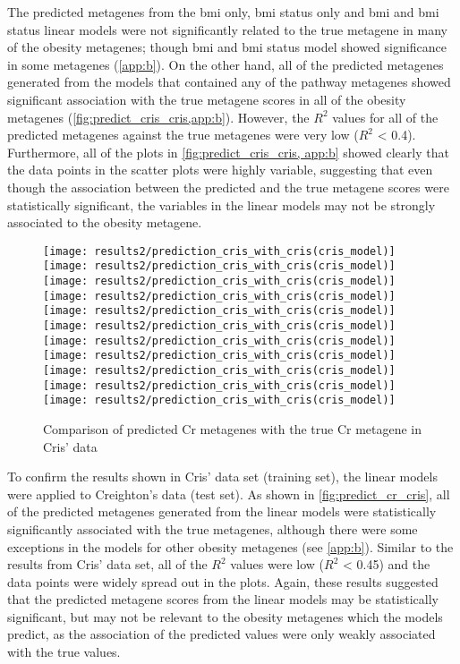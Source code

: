 The predicted metagenes from the \gls{bmi} only, \gls{bmi} status only and \gls{bmi} and \gls{bmi} status linear models were not significantly related to the true metagene in many of the obesity metagenes; though \gls{bmi} and \gls{bmi} status model showed significance in some metagenes (\cref{app:b}).
On the other hand, all of the predicted metagenes generated from the models that contained any of the pathway metagenes showed significant association with the true metagene scores in all of the obesity metagenes (\cref{fig:predict_cris_cris,app:b}).
However, the $R^2$ values for all of the predicted metagenes against the true metagenes were very low ($R^2$ \textless{} 0.4).
Furthermore, all of the plots in \cref{fig:predict_cris_cris, app:b} showed clearly that the data points in the scatter plots were highly variable, suggesting that even though the association between the predicted and the true metagene scores were statistically significant, the variables in the linear models may not be strongly associated to the obesity metagene.

\begin{figure}[htpb]
	\centering
	\texttt{[image: results2/prediction\_cris\_with\_cris(cris\_model)]}
	\texttt{[image: results2/prediction\_cris\_with\_cris(cris\_model)]}
	\texttt{[image: results2/prediction\_cris\_with\_cris(cris\_model)]}
	\texttt{[image: results2/prediction\_cris\_with\_cris(cris\_model)]}
	\texttt{[image: results2/prediction\_cris\_with\_cris(cris\_model)]}
	\texttt{[image: results2/prediction\_cris\_with\_cris(cris\_model)]}
	\texttt{[image: results2/prediction\_cris\_with\_cris(cris\_model)]}
	\texttt{[image: results2/prediction\_cris\_with\_cris(cris\_model)]}
	\texttt{[image: results2/prediction\_cris\_with\_cris(cris\_model)]}
	\texttt{[image: results2/prediction\_cris\_with\_cris(cris\_model)]}
	\texttt{[image: results2/prediction\_cris\_with\_cris(cris\_model)]}
	\caption{Comparison of predicted Cr metagenes with the true Cr metagene in Cris' data}
	\label{fig:predict_cris_cris}
\end{figure}

To confirm the results shown in Cris' data set (training set), the linear models were applied to Creighton's data (test set).
As shown in \cref{fig:predict_cr_cris}, all of the predicted metagenes generated from the linear models were statistically significantly associated with the true metagenes, although there were some exceptions in the models for other obesity metagenes (see \cref{app:b}).
Similar to the results from Cris' data set, all of the $R^2$ values were low ($R^2$ \textless{} 0.45) and the data points were widely spread out in the plots.
Again, these results suggested that the predicted metagene scores from the linear models may be statistically significant, but may not be relevant to the obesity metagenes which the models predict, as the association of the predicted values were only weakly associated with the true values.
\\

